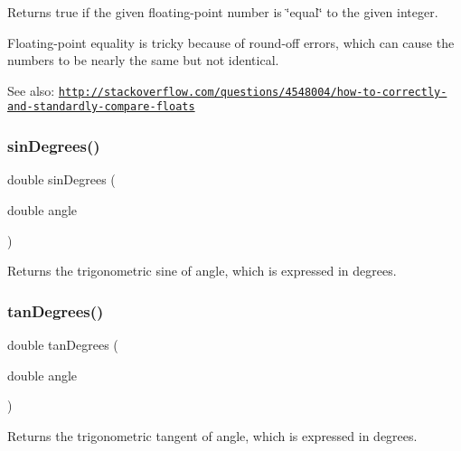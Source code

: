 Returns true if the given floating-\/point number is \char`\"{}equal\char`\"{} to the given integer. 

Floating-\/point equality is tricky because of round-\/off errors, which can cause the numbers to be nearly the same but not identical.

See also\+: \href{http://stackoverflow.com/questions/4548004/how-to-correctly-and-standardly-compare-floats}{\tt http\+://stackoverflow.\+com/questions/4548004/how-\/to-\/correctly-\/and-\/standardly-\/compare-\/floats} \mbox{\label{namespacesgl_1_1math_a14399b27986d63b0ab2df12e3bc80897}} 
\subsubsection{\texorpdfstring{sin\+Degrees()}{sinDegrees()}}
{\footnotesize\ttfamily double sin\+Degrees (\begin{DoxyParamCaption}\item[{double}]{angle }\end{DoxyParamCaption})}



Returns the trigonometric sine of {\ttfamily angle}, which is expressed in degrees. 

\mbox{\label{namespacesgl_1_1math_a32f462a3ccaa75b0d53ab30b9ff72394}} 
\subsubsection{\texorpdfstring{tan\+Degrees()}{tanDegrees()}}
{\footnotesize\ttfamily double tan\+Degrees (\begin{DoxyParamCaption}\item[{double}]{angle }\end{DoxyParamCaption})}



Returns the trigonometric tangent of {\ttfamily angle}, which is expressed in degrees. 

\mbox{\label{namespacesgl_1_1math_a743ea7ec7653fe3ee75df86682edbb04}} 
